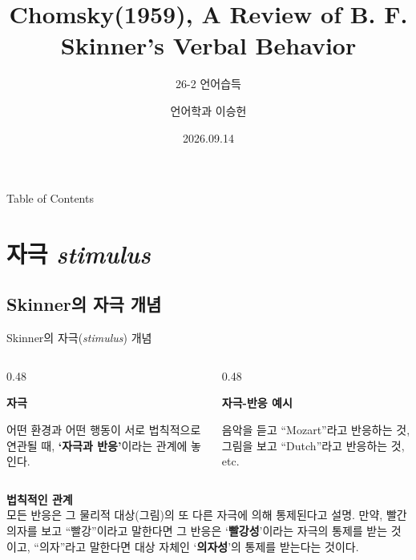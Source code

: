 \documentclass[aspectratio=169]{beamer}
\title{Chomsky(1959), A Review of B. F. Skinner's Verbal Behavior}
\subtitle{26-2 언어습득}
\author{언어학과 이승헌}
\date{2026.09.14}
\begin{document}
\begin{frame}
  \titlepage
\end{frame}

\begin{frame}{Table of Contents}
  \tableofcontents
\end{frame}

\section{자극 \textit{stimulus}}
\subsection{Skinner의 자극 개념}

\begin{frame}[t]{Skinner의 자극(\textit{stimulus}) 개념}
    \vspace{1cm}
  \begin{columns}[T,onlytextwidth]
    \begin{column}[t]{0.48\textwidth}
      \begin{minipage}[t][3cm][t]{\linewidth}
        \textbf{자극}

        \medskip
        어떤 환경과 어떤 행동이 서로 법칙적으로 연관될 때,
        \textbf{‘자극과 반응’}이라는 관계에 놓인다.
      \end{minipage}
    \end{column}

    \begin{column}[t]{0.48\textwidth}
      \begin{minipage}[t][3cm][t]{\linewidth}
        \textbf{자극-반응 예시}

        \medskip
        음악을 듣고 “Mozart”라고 반응하는 것, 그림을 보고 “Dutch”라고 반응하는 것, etc. 
      \end{minipage}
    \end{column}
  \end{columns}

  \vspace{0.6em}

  \begin{columns}[T,onlytextwidth]
    \begin{column}{\textwidth}
      \textbf{법칙적인 관계}
      \medskip
      \\ 모든 반응은 그 물리적 대상(그림)의 또 다른 자극에 의해 통제된다고 설명. 만약, 빨간 의자를 보고 “빨강”이라고 말한다면 그 반응은 `\textbf{빨강성}'이라는 자극의 통제를 받는 것이고, “의자”라고 말한다면 대상 자체인 `\textbf{의자성}'의 통제를 받는다는 것이다.   
    \end{column}
  \end{columns}
\end{frame}
\end{document}
